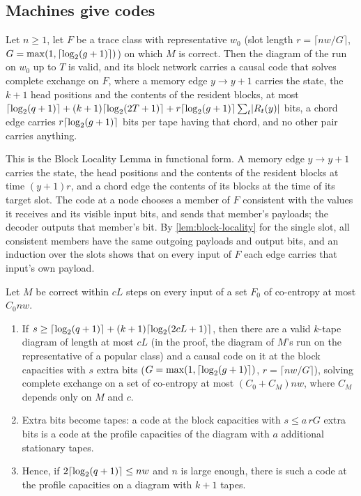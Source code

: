 \subsection{Machines give codes}

\begin{lemma}\label{lem:class-code}
Let $n\ge1$, let $F$ be a trace class with representative $w_0$ (slot length $r=\lceil nw/G\rceil$,
$G=\max(1,\lceil \log_2 (g+1) \rceil)$) on which $M$ is correct. Then the diagram of the run on $w_0$ up to $T$ is
valid, and its block network carries a causal code that solves complete exchange on $F$, where a
memory edge $y\to y+1$ carries the state, the $k+1$ head positions and the contents of the resident
blocks, at most $\lceil \log_2 (q+1) \rceil+(k+1)\lceil \log_2 (2T+1) \rceil+r\lceil \log_2 (g+1) \rceil\sum_t\lvert R_t(y) \rvert$ bits, a chord edge
carries $r\lceil \log_2 (g+1) \rceil$ bits per tape having that chord, and no other pair carries anything.
\end{lemma}

\begin{outline}
This is the Block Locality Lemma in functional form. A memory edge $y\to y+1$ carries the state, the head
positions and the contents of the resident blocks at time $(y+1)r$, and a chord edge the contents of its
blocks at the time of its target slot. The code at a node chooses a member of $F$ consistent with the values
it receives and its visible input bits, and sends that member's payloads; the decoder outputs that member's
bit. By \cref{lem:block-locality} for the single slot, all consistent members have the same outgoing payloads
and output bits, and an induction over the slots shows that on every input of $F$ each edge carries that
input's own payload.
\end{outline}

\begin{theorem}\label{thm:fast-codes}
Let $M$ be correct within $cL$ steps on every input of a set $F_0$ of co-entropy at most $C_0nw$.
\begin{enumerate}[label=(\alph*)]
\item If $s\ge\lceil \log_2 (q+1) \rceil+(k+1)\lceil \log_2 (2cL+1) \rceil$, then there are a valid $k$-tape diagram of length at most
$cL$ (in the proof, the diagram of $M$'s run on the representative of a popular class) and a causal code on
it at the block capacities with $s$ extra bits ($G=\max(1,\lceil \log_2 (g+1) \rceil)$, $r=\lceil nw/G\rceil$), solving
complete exchange on a set of co-entropy at most $(C_0+C_M)nw$, where $C_M$ depends only on $M$ and $c$.
\item Extra bits become tapes: a code at the block capacities with $s\le a\,rG$ extra bits is a code at
the profile capacities of the diagram with $a$ additional stationary tapes.
\item Hence, if $2\lceil \log_2 (q+1) \rceil\le nw$ and $n$ is large enough, there is such a code at the profile
capacities on a diagram with $k+1$ tapes.
\end{enumerate}
\end{theorem}

